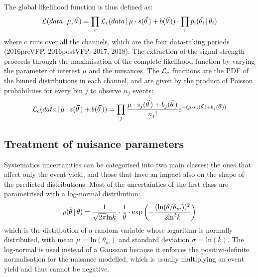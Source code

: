 The global likelihood function is thus defined as:
\begin{equation}
  \label{eq:likelihood_full}
  \mathcal{L}(data\, |\, \mu, \vec\theta\,) = \prod_c \mathcal{L}_c(data\, |\, \mu \cdot s(\vec\theta\,) + b(\vec\theta\,)) \cdot \prod_i p_i(\tilde{\theta_i}\, |\, \theta_i)
\end{equation}
where c runs over all the channels, which are the four data-taking periods (2016preVFP, 2016postVFP, 2017, 2018).
The extraction of the signal strength proceeds through the maximisation of the complete likelihood function by varying the parameter of interest $\mu$ and the nuisances.
The $\mathcal{L}_c$ functions are the PDF of the binned distributions in each channel, and are given by the product of Poisson probabilities for every bin $j$ to observe $n_j$ events:
\begin{equation}
  \label{eq:likelihood_bin}
  \mathcal{L}_c(data\, |\, \mu \cdot s(\vec\theta\,) + b(\vec\theta\,)) = \prod_j \frac{\mu \cdot s_j(\vec\theta\,) + b_j(\vec\theta\,)}{n_j!} e^{-(\mu \cdot s_j(\vec\theta\,) + b_j(\vec\theta\,))}
\end{equation}

\subsection{Treatment of nuisance parameters}
Systematics uncertainties can be categorised into two main classes: the ones that affect only the event yield, and those that have an impact also on the shape of the predicted distributions.
Most of the uncertainties of the first class are parametrised with a log-normal distribution:
\begin{equation}
  \label{eq:lnNdef}
  p(\tilde{\theta}\,|\,\theta) = \frac{1}{\sqrt{2 \pi} \text{ln} k} \cdot \frac{1}{\tilde{\theta}} \cdot \text{exp} \left( -\frac{(\text{ln}(\tilde{\theta}/\theta_m))^2}{2 \text{ln}^2 k} \right)
\end{equation}
which is the distribution of a random variable whose logarithm is normally distributed, with mean $\mu$ = $\text{ln}(\theta_m)$ and standard deviation $\sigma$ = $\text{ln}(k)$.
The log-normal is used instead of a Gaussian because it enforces the positive-definite normalisation for the nuisance modelled, which is usually multiplying an event yield and thus cannot be negative.

